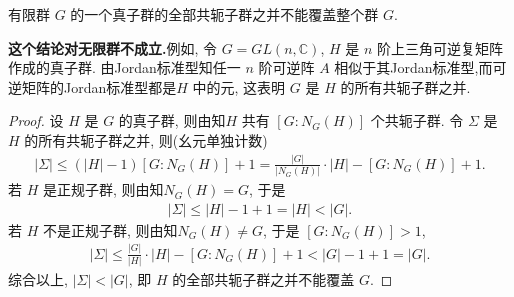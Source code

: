 \documentclass[../../main.tex]{subfiles}%
\begin{document}
\begin{proposition}\label{proposition:有限群的真子群的共轭子群之并不能覆盖整个群}
有限群 $G$ 的一个真子群的全部共轭子群之并不能覆盖整个群 $G$.
\end{proposition}
\begin{remark}
\textbf{这个结论对无限群不成立.}例如, 令 $G = GL(n,\mathbb{C})$, $H$ 是 $n$ 阶上三角可逆复矩阵作成的真子群. 由Jordan标准型知任一 $n$ 阶可逆阵 $A$ 相似于其Jordan标准型,而可逆矩阵的Jordan标准型都是$H$ 中的元, 这表明 $G$ 是 $H$ 的所有共轭子群之并.
\end{remark}
\begin{proof}
设 $H$ 是 $G$ 的真子群, 则由知$H$ 共有 $[G:N_G(H)]$ 个共轭子群. 令 $\Sigma$ 是 $H$ 的所有共轭子群之并, 则(幺元单独计数)
\begin{align*}
|\Sigma| \leqslant (|H| - 1)[G:N_G(H)] + 1 = \frac{|G|}{|N_G(H)|} \cdot |H| - [G:N_G(H)] + 1.
\end{align*}
若 $H$ 是正规子群, 则由知$N_G(H) = G$, 于是
\begin{align*}
|\Sigma| \leqslant |H| - 1 + 1 = |H| < |G|.
\end{align*}
若 $H$ 不是正规子群, 则由知$N_G(H) \neq G$, 于是 $[G:N_G(H)] > 1$,
\begin{align*}
|\Sigma| \leqslant \frac{|G|}{|H|} \cdot |H| - [G:N_G(H)] + 1 < |G| - 1 + 1 = |G|.
\end{align*}
综合以上, $|\Sigma| < |G|$, 即 $H$ 的全部共轭子群之并不能覆盖 $G$.
\end{proof}
\end{document}
